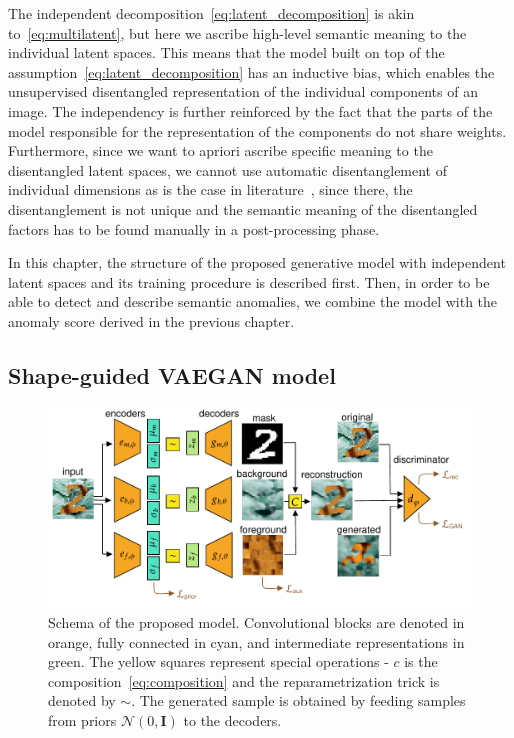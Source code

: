 The independent decomposition~\eqref{eq:latent_decomposition} is akin to~\eqref{eq:multilatent}, but here we ascribe high-level semantic meaning to the individual latent spaces. This means that the model built on top of the assumption~\eqref{eq:latent_decomposition} has an inductive bias, which enables the unsupervised disentangled representation of the individual components of an image. The independency is further reinforced by the fact that the parts of the model responsible for the representation of the components do not share weights. Furthermore, since we want to apriori ascribe specific meaning to the disentangled latent spaces, we cannot use automatic disentanglement of individual dimensions as is the case in literature~\cite{burgess2018understanding, kim2019bayes, deecke2021transfer}, since there, the disentanglement is not unique and the semantic meaning of the disentangled factors has to be found manually in a post-processing phase.

In this chapter, the structure of the proposed generative model with independent latent spaces and its training procedure is described first. Then, in order to be able to detect and describe semantic anomalies, we combine the model with the anomaly score derived in the previous chapter.

\subsection{Shape-guided VAEGAN model} \label{sec:sgvaegan}
 \begin{figure}[ht]
    \centering
       \includegraphics[width=\textwidth]{data/chapter_sgvaegan/fig2_sgvaegan_losses.pdf}
    \caption{Schema of the proposed model. Convolutional blocks are denoted in orange, fully connected in cyan, and intermediate representations in green. The yellow squares represent special operations - $c$ is the composition~\eqref{eq:composition} and the reparametrization trick is denoted by $\sim$. The generated sample is obtained by feeding samples from priors $\mathcal{N}(0,\mathbf{I})$ to the decoders.}
    \label{fig:sgvaegan_schema}
\end{figure}

